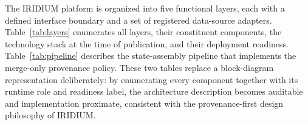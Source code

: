 
The IRIDIUM platform is organized into five functional layers, each with a
defined interface boundary and a set of registered data-source adapters.
Table~\ref{tab:layers} enumerates all layers, their constituent components,
the technology stack at the time of publication, and their deployment
readiness.
Table~\ref{tab:pipeline} describes the state-assembly pipeline that
implements the merge-only provenance policy.
These two tables replace a block-diagram representation deliberately: by
enumerating every component together with its runtime role and readiness
label, the architecture description becomes auditable and implementation
proximate, consistent with the provenance-first design philosophy of
IRIDIUM.

